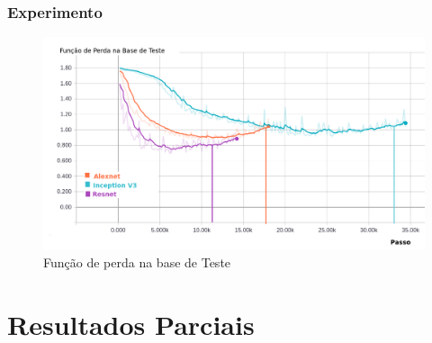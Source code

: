 \documentclass{beamer}
\begin{document}
\begin{frame}
\frametitle{Experimento}
\begin{figure}
\centering
\includegraphics[scale=0.32]{figuras/loss-val.png}
\caption{Função de perda na base de Teste}
\label{fig:arquitetura4}
\end{figure}
\end{frame}




\section{Resultados Parciais}
\end{document}
